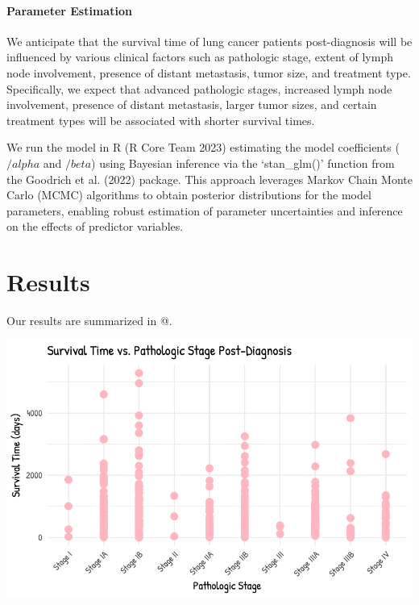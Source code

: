 \documentclass[
  letterpaper,
  DIV=11,
  numbers=noendperiod]{scrartcl}
\let\oldparagraph\paragraph
\renewcommand{\paragraph}[1]{\oldparagraph{#1}\mbox{}}
\begin{document}
\hypertarget{parameter-estimation}{%
\paragraph{Parameter Estimation}\label{parameter-estimation}}

We anticipate that the survival time of lung cancer patients
post-diagnosis will be influenced by various clinical factors such as
pathologic stage, extent of lymph node involvement, presence of distant
metastasis, tumor size, and treatment type. Specifically, we expect that
advanced pathologic stages, increased lymph node involvement, presence
of distant metastasis, larger tumor sizes, and certain treatment types
will be associated with shorter survival times.

We run the model in R (R Core Team 2023) estimating the model
coefficients (\(/alpha\) and \(/beta\)) using Bayesian inference via the
`stan\_glm()' function from the Goodrich et al. (2022) package. This
approach leverages Markov Chain Monte Carlo (MCMC) algorithms to obtain
posterior distributions for the model parameters, enabling robust
estimation of parameter uncertainties and inference on the effects of
predictor variables.

\hypertarget{sec-results}{%
\section{Results}\label{sec-results}}

Our results are summarized in @.

\includegraphics{paper_files/figure-pdf/unnamed-chunk-4-1.pdf}
\end{document}
